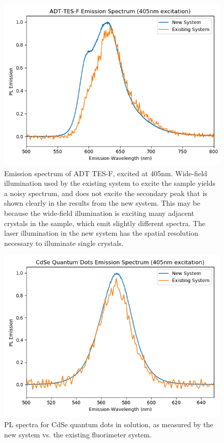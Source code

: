 \begin{figure}[h]
    \centering
    \includegraphics[width=\textwidth]{./img/tesf-2.png}
    \caption{Emission spectrum of ADT TES-F, excited at 405nm.
    Wide-field illumination used by the existing system to excite the sample
    yields a noisy spectrum, and does not excite the secondary peak that is 
    shown clearly in the results from the new system. This may be because the
    wide-field illumination is exciting many adjacent crystals in the sample, 
    which emit slightly different spectra. The laser illumination in the new 
    system has the spatial resolution necessary to illuminate single crystals.}
    \label{fig:pl-adt-tesf}
\end{figure}

\begin{figure}[h]
    \centering
    \includegraphics[width=\textwidth]{./img/qd-2.png}
    \caption{PL spectra for CdSe quantum dots in solution, as measured by the new system vs. the existing fluorimeter system.}
    \label{fig:pl-adt-qd}
\end{figure}